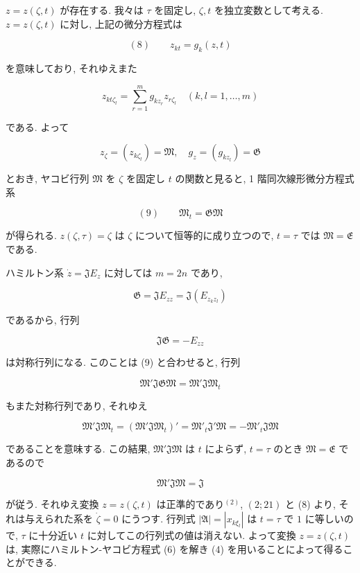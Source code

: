 \documentclass[dvipdfmx, leqno]{jsbook}
\begin{document}

$z = z(\zeta, t)$ が存在する. 我々は $\tau$ を固定し, $\zeta, t$ を独立変数として考える. $z = z(\zeta, t)$ に対し, 上記の微分方程式は

$$(8) \qquad z_{kt} = g_k(z, t)$$

を意味しており, それゆえまた

$$z_{kt\zeta_l} = \sum_{r=1}^{m} g_{kz_r} z_{r\zeta_l} \quad (k,l=1,\dots,m)$$

である. よって

$$z_\zeta = (z_{k\zeta_l}) = \mathfrak{M}, \quad g_z = (g_{kz_l}) = \mathfrak{G}$$

とおき, ヤコビ行列 $\mathfrak{M}$ を $\zeta$ を固定し $t$ の関数と見ると, 1 階同次線形微分方程式系

$$(9) \qquad \mathfrak{M}_t = \mathfrak{G}\mathfrak{M}$$

が得られる. $z(\zeta, \tau) = \zeta$ は $\zeta$ について恒等的に成り立つので, $t = \tau$ では $\mathfrak{M} = \mathfrak{E}$ である.

ハミルトン系 $\dot{z} = \mathfrak{J} E_z$ に対しては $m = 2n$ であり,

$$\mathfrak{G} = \mathfrak{J} E_{zz} = \mathfrak{J}(E_{z_k z_l})$$

であるから, 行列

$$\mathfrak{J}\mathfrak{G} = -E_{zz}$$

は対称行列になる. このことは (9) と合わせると, 行列

$$\mathfrak{M}'\mathfrak{J}\mathfrak{G}\mathfrak{M} = \mathfrak{M}'\mathfrak{J}\mathfrak{M}_t$$

もまた対称行列であり, それゆえ

$$\mathfrak{M}'\mathfrak{J}\mathfrak{M}_t = (\mathfrak{M}'\mathfrak{J}\mathfrak{M}_t)' = \mathfrak{M}'_t\mathfrak{J}'\mathfrak{M} = -\mathfrak{M}'_t\mathfrak{J}\mathfrak{M}$$

であることを意味する. この結果, $\mathfrak{M}'\mathfrak{J}\mathfrak{M}$ は $t$ によらず, $t = \tau$ のとき $\mathfrak{M} = \mathfrak{E}$ であるので

$$\mathfrak{M}'\mathfrak{J}\mathfrak{M} = \mathfrak{J}$$

が従う. それゆえ変換 $z = z(\zeta, t)$ は正準的であり$^{(2)}$, $(2;21)$ と (8) より, それは与えられた系を $\dot{\zeta} = 0$ にうつす. 行列式 $|\mathfrak{A}| = |x_{k\xi_l}|$ は $t = \tau$ で $1$ に等しいので, $\tau$ に十分近い $t$ に対してこの行列式の値は消えない. よって変換 $z = z(\zeta, t)$ は, 実際にハミルトン-ヤコビ方程式 (6) を解き (4) を用いることによって得ることができる.
\end{document}
